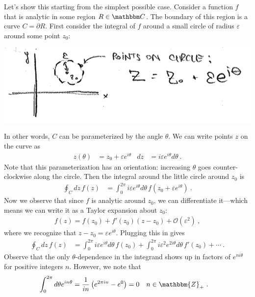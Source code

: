 Let's show this starting from the simplest possible case. Consider a function $f$ that is analytic in some region $R\in \mathbbm C$. The boundary of this region is a curve $C = \partial R$. First consider the integral of $f$ around a small circle of radius $\varepsilon$ around some point $z_0$:
\begin{center}
\includegraphics[width=.7\textwidth]{figures/Lec_2017_12_circle.png}
\end{center}
In other words, $C$ can be parameterized by the angle $\theta$. We can write points $z$ on the curve as
\begin{align}
  z(\theta) &= z_0 + \varepsilon e^{i\theta} 
  &
  dz &= i \varepsilon e^{i\theta} d\theta \ .
\end{align}
Note that this parameterization has an orientation: increasing $\theta$ goes counter-clockwise along the circle.
Then the integral around the little circle around $z_0$ is
\begin{align}
  \oint_C dz\, f(z) &= \int_0^{2\pi} i \varepsilon e^{i\theta} d\theta \, f\left( z_0 + \varepsilon e^{i\theta} \right) \ .
\end{align}
Now we observe that since $f$ is analytic around $z_0$, we can differentiate it---which means we can write it as a Taylor expansion about $z_0$:
\begin{align}
  f(z)
   = f(z_0) + f'(z_0)(z-z_0) + \mathcal O(\varepsilon^2) \ ,
\end{align}
where we recognize that $z-z_0 = \varepsilon e^{i\theta}$. Plugging this in gives
\begin{align}
  \oint_C dz\, f(z) &= 
  \int_0^{2\pi} i \varepsilon e^{i\theta} d\theta \, f(z_0) 
  +
  \int_0^{2\pi} i \varepsilon^2 e^{2i\theta} d\theta \, f'(z_0) 
  + \cdots
  \ .
\end{align}
Observe that the only $\theta$-dependence in the integrand shows up in factors of $e^{n i\theta}$ for positive integers $n$. However, we note that
\begin{align}
  \int_0^{2\pi} d\theta e^{in\theta} 
  &= 
  \frac{1}{in} \left(e^{2\pi i n} - e^{0}\right)
  = 0 
  &
  n &\in \mathbbm{Z}_+
  \ .
  \label{eq:complex:theta:integral:trivial}
\end{align}
